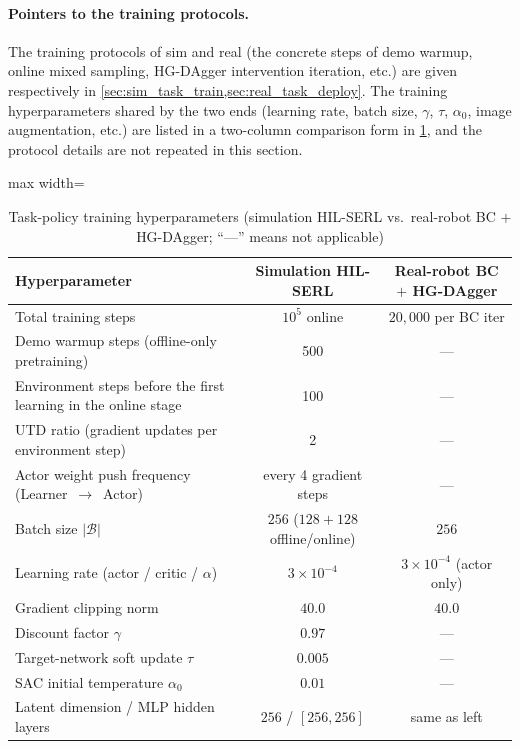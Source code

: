 \paragraph{Pointers to the training protocols.} The training protocols of sim and real (the concrete steps of demo warmup, online mixed sampling, HG-DAgger intervention iteration, etc.) are given respectively in \cref{sec:sim_task_train,sec:real_task_deploy}. The training hyperparameters shared by the two ends (learning rate, batch size, $\gamma$, $\tau$, $\alpha_0$, image augmentation, etc.) are listed in a two-column comparison form in \cref{tab:hyperparams}, and the protocol details are not repeated in this section.

\begin{table}[htbp]
  \centering
  \caption{Task-policy training hyperparameters (simulation HIL-SERL vs.\ real-robot BC $+$ HG-DAgger; ``---'' means not applicable)}
  \label{tab:hyperparams}
  \small
  \begin{adjustbox}{max width=\textwidth}
  \begin{tabular}{@{}lcc@{}}
    \toprule
    Hyperparameter & Simulation HIL-SERL & Real-robot BC $+$ HG-DAgger \\
    \midrule
    Total training steps & $10^5$ online & $20{,}000$ per BC iter \\
    Demo warmup steps (offline-only pretraining) & 500 & --- \\
    Environment steps before the first learning in the online stage & 100 & --- \\
    UTD ratio (gradient updates per environment step) & 2 & --- \\
    Actor weight push frequency (Learner~$\to$~Actor) & every 4 gradient steps & --- \\
    \midrule
    Batch size $|\mathcal{B}|$ & $256$ ($128+128$ offline/online) & $256$ \\
    Learning rate (actor / critic / $\alpha$) & $3 \times 10^{-4}$ & $3 \times 10^{-4}$ (actor only) \\
    Gradient clipping norm & $40.0$ & $40.0$ \\
    Discount factor $\gamma$ & $0.97$ & --- \\
    Target-network soft update $\tau$ & $0.005$ & --- \\
    SAC initial temperature $\alpha_0$ & $0.01$ & --- \\
    \midrule
    Latent dimension / MLP hidden layers & $256$ / $[256, 256]$ & same as left \\

\end{tabular}
\end{adjustbox}
\end{table}
